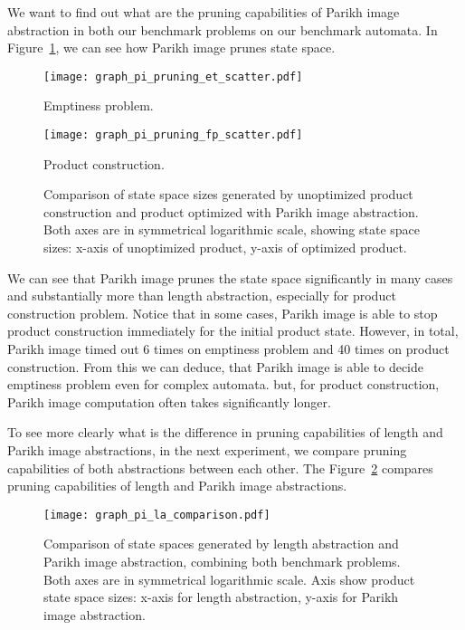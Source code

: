 We want to find out what are the pruning capabilities of Parikh image abstraction in both our benchmark problems on our benchmark automata. In Figure~\ref{fig:graph:pi_product_state_space_sizes_pruning_cap}, we can see how Parikh image prunes state space.
\begin{figure}[ht]
    \centering
    \begin{minipage}{0.49\linewidth}
        \centering
        \texttt{[image: graph\_pi\_pruning\_et\_scatter.pdf]}
        \caption{Emptiness problem.}
        \label{fig:graph:pi_et_state_space_sizes_comp}
    \end{minipage}
    \hfill
    \begin{minipage}{0.49\linewidth}
        \centering
        \texttt{[image: graph\_pi\_pruning\_fp\_scatter.pdf]}
        \caption{Product construction.}
        \label{fig:graph:pi_fp_state_space_sizes_comp}
    \end{minipage}
    \vspace{0.5cm}
    \caption{Comparison of state space sizes generated by unoptimized product construction and product optimized with Parikh image abstraction. Both axes are in symmetrical logarithmic scale, showing state space sizes: x-axis of unoptimized product, y-axis of optimized product.}
    \label{fig:graph:pi_product_state_space_sizes_pruning_cap}
\end{figure}

We can see that Parikh image prunes the state space significantly in many cases and substantially more than length abstraction, especially for product construction problem. Notice that in some cases, Parikh image is able to stop product construction immediately for the initial product state. However, in total, Parikh image timed out 6 times on emptiness problem and 40 times on product construction. From this we can deduce, that Parikh image is able to decide emptiness problem even for complex automata. but, for product construction, Parikh image computation often takes significantly longer.

To see more clearly what is the difference in pruning capabilities of length and Parikh image abstractions, in the next experiment, we compare pruning capabilities of both abstractions between each other. The Figure~\ref{fig:diagram:pi_product_state_space_sizes} compares pruning capabilities of length and Parikh image abstractions.

\begin{figure}[ht]
	\centering
	\texttt{[image: graph\_pi\_la\_comparison.pdf]}
	\caption{Comparison of state spaces generated by length abstraction and Parikh image abstraction, combining both benchmark problems. Both axes are in symmetrical logarithmic scale. Axis show product state space sizes: x-axis for length abstraction, y-axis for Parikh image abstraction.}
	\label{fig:diagram:pi_product_state_space_sizes}
\end{figure}

